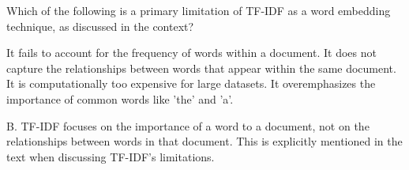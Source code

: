 \documentclass[11pt,addpoints,answers]{exam}
\begin{document}
\begin{questions}
%

\question[1] Which of the following is a primary limitation of TF-IDF as a word embedding technique, as discussed in the context?
  \begin{choices}
    \choice It fails to account for the frequency of words within a document.
    \choice It does not capture the relationships between words that appear within the same document.
    \choice It is computationally too expensive for large datasets.
    \choice It overemphasizes the importance of common words like 'the' and 'a'.
  \end{choices}
\begin{solution}
B. TF-IDF focuses on the importance of a word to a document, not on the relationships between words in that document. This is explicitly mentioned in the text when discussing TF-IDF's limitations.


\end{solution}
\end{questions}
\end{document}
